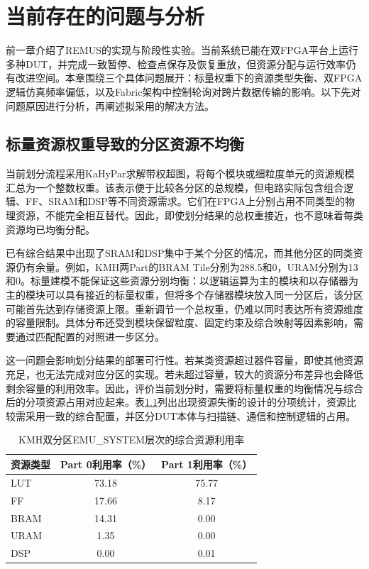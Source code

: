 \chapter{当前存在的问题与分析}
\label{chap:midterm-problems}

前一章介绍了REMUS的实现与阶段性实验。当前系统已能在双FPGA平台上运行多种DUT，并完成一致暂停、检查点保存及恢复重放，但资源分配与运行效率仍有改进空间。本章围绕三个具体问题展开：标量权重下的资源类型失衡、双FPGA逻辑仿真频率偏低，以及Fabric架构中控制轮询对跨片数据传输的影响。以下先对问题原因进行分析，再阐述拟采用的解决方法。

\section{标量资源权重导致的分区资源不均衡}
\label{sec:midterm-scalar-resource-problem}

当前划分流程采用KaHyPar求解带权超图，将每个模块或细粒度单元的资源规模汇总为一个整数权重。该表示便于比较各分区的总规模，但电路实际包含组合逻辑、FF、SRAM和DSP等不同资源需求。它们在FPGA上分别占用不同类型的物理资源，不能完全相互替代。因此，即使划分结果的总权重接近，也不意味着每类资源均已均衡分配。

已有综合结果中出现了SRAM和DSP集中于某个分区的情况，而其他分区的同类资源仍有余量。例如，KMH两Part的BRAM Tile分别为288.5和0，URAM分别为13和0。标量建模不能保证这些资源分别均衡：以逻辑运算为主的模块和以存储器为主的模块可以具有接近的标量权重，但将多个存储器模块放入同一分区后，该分区可能首先达到存储资源上限。重新调节一个总权重，仍难以同时表达所有资源维度的容量限制。具体分布还受到模块保留粒度、固定约束及综合映射等因素影响，需要通过匹配配置的对照进一步区分。

这一问题会影响划分结果的部署可行性。若某类资源超过器件容量，即使其他资源充足，也无法完成对应分区的实现。若未超过容量，较大的资源分布差异也会降低剩余容量的利用效率。因此，评价当前划分时，需要将标量权重的均衡情况与综合后的分项资源占用对应起来。表\ref{tab:midterm-resource-imbalance}列出出现资源失衡的设计的分项统计，资源比较需采用一致的综合配置，并区分DUT本体与扫描链、通信和控制逻辑的占用。

\begin{table}[htbp]
    \centering
    \caption{KMH双分区EMU\_SYSTEM层次的综合资源利用率}
    \label{tab:midterm-resource-imbalance}
    \begin{tabular}{@{}lcc@{}}
        \toprule
        资源类型 & Part 0利用率（\%） & Part 1利用率（\%） \\
        \midrule
        LUT  & 73.18 & 75.77 \\
        FF   & 17.66 & 8.17 \\
        BRAM & 14.31 & 0.00 \\
        URAM & 1.35 & 0.00 \\
        DSP  & 0.00 & 0.01 \\
        \bottomrule
    \end{tabular}
\end{table}

